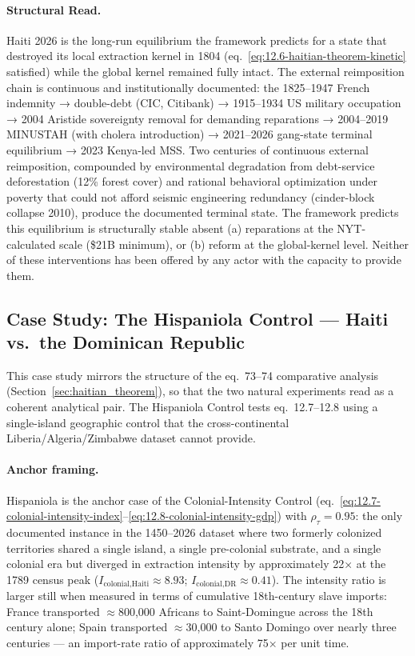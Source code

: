 \paragraph{Structural Read.}
Haiti 2026 is the long-run equilibrium the framework predicts for a state that destroyed its local extraction kernel in 1804 (eq.~\ref{eq:12.6-haitian-theorem-kinetic} satisfied) while the global kernel remained fully intact. The external reimposition chain is continuous and institutionally documented: the 1825--1947 French indemnity → double-debt (CIC, Citibank) → 1915--1934 US military occupation → 2004 Aristide sovereignty removal for demanding reparations → 2004--2019 MINUSTAH (with cholera introduction) → 2021--2026 gang-state terminal equilibrium → 2023 Kenya-led MSS. Two centuries of continuous external reimposition, compounded by environmental degradation from debt-service deforestation (12\% forest cover) and rational behavioral optimization under poverty that could not afford seismic engineering redundancy (cinder-block collapse 2010), produce the documented terminal state. The framework predicts this equilibrium is structurally stable absent (a) reparations at the NYT-calculated scale (\$21B minimum), or (b) reform at the global-kernel level. Neither of these interventions has been offered by any actor with the capacity to provide them.

\subsection*{Case Study: The Hispaniola Control --- Haiti vs.\ the Dominican Republic}
\label{sec:hispaniola_case_study}

This case study mirrors the structure of the eq.~73--74 comparative analysis (Section~\ref{sec:haitian_theorem}), so that the two natural experiments read as a coherent analytical pair. The Hispaniola Control tests eq.~12.7--12.8 using a single-island geographic control that the cross-continental Liberia/Algeria/Zimbabwe dataset cannot provide.

\paragraph{Anchor framing.}
Hispaniola is the anchor case of the Colonial-Intensity Control (eq.~\ref{eq:12.7-colonial-intensity-index}--\ref{eq:12.8-colonial-intensity-gdp}) with $\rho_\tau = 0.95$: the only documented instance in the 1450--2026 dataset where two formerly colonized territories shared a single island, a single pre-colonial substrate, and a single colonial era but diverged in extraction intensity by approximately 22× at the 1789 census peak ($I_{\text{colonial,Haiti}} \approx 8.93$; $I_{\text{colonial,DR}} \approx 0.41$). The intensity ratio is larger still when measured in terms of cumulative 18th-century slave imports: France transported $\approx$800,000 Africans to Saint-Domingue across the 18th century alone; Spain transported $\approx$30,000 to Santo Domingo over nearly three centuries --- an import-rate ratio of approximately 75× per unit time.

